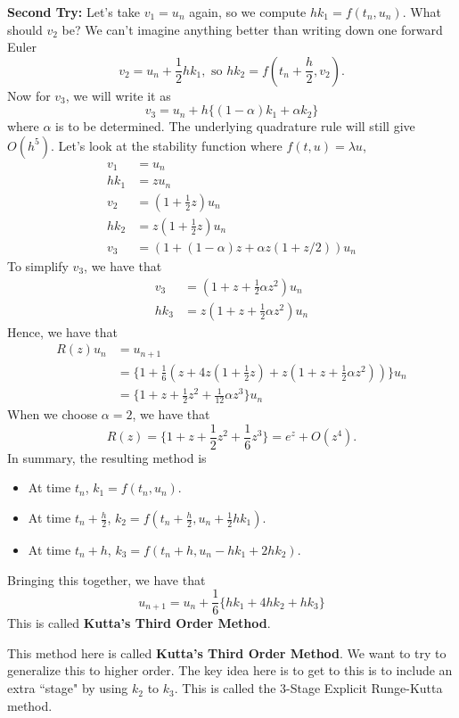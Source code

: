 \documentclass{article}
\begin{document}
\textbf{Second Try: } Let's take $v_1 = u_n$ again, so we compute $h k_1 = f(t_n, u_n)$. What should $v_2$ be? We can't imagine anything better than writing down one forward Euler
\[v_2 = u_n + \frac{1}{2} h k_1, \text{ so } h k_2 = f(t_n + \frac{h}{2}, v_2).\]
Now for $v_3$, we will write it as
\[v_3 = u_n + h \{(1 - \alpha) k_1 + \alpha k_2\} \]
where $\alpha$ is to be determined. The underlying quadrature rule will still give $O(h^5)$. Let's look at the stability function where $f(t, u) = \lambda u$,
\begin{align*}
    v_1 &= u_n\\
    h k_1 &= z u_n\\
    v_2 &= (1 + \frac{1}{2}z) u_n\\
    h k_2 &= z (1 + \frac{1}{2}z) u_n\\
    v_3 &= (1 + (1-\alpha) z + \alpha z (1 + z/2)) u_n
\end{align*}
To simplify $v_3$, we have that
\begin{align*}
    v_3 &= (1 + z + \frac{1}{2} \alpha z^2) u_n\\
    h k_3 &= z (1 + z + \frac{1}{2} \alpha z^2) u_n
\end{align*}
Hence, we have that
\begin{align*}
    R(z) u_n &= u_{n+1}\\
    &= \{1 + \frac{1}{6} (z + 4 z (1 + \frac{1}{2} z) + z (1 + z + \frac{1}{2} \alpha z^2)) \} u_n\\
    &= \{1 + z + \frac{1}{2} z^2 + \frac{1}{12} \alpha z^3\} u_n
\end{align*}
When we choose $\alpha = 2$, we have that
\[R(z) =  \{1 + z + \frac{1}{2} z^2 + \frac{1}{6} z^3\} = e^z + O(z^4).\]
In summary, the resulting method is
\begin{itemize}
    \item At time $t_n$, $k_1 = f(t_n, u_n)$.
    \item At time $t_n + \frac{h}{2}$, $k_2 = f(t_n + \frac{h}{2}, u_n + \frac{1}{2} h k_1)$.
    \item At time $t_n + h$, $k_3 = f(t_n + h, u_n - h k_1 + 2h k_2)$.
\end{itemize}
Bringing this together, we have that
\[u_{n+1} = u_n + \frac{1}{6} \{h k_1 + 4 h k_2 + h k_3\}\]
This is called \textbf{Kutta's Third Order Method}.

This method here is called \textbf{Kutta's Third Order Method}. We want to try to generalize this to higher order. The key idea here is to get to this is to include an extra ``stage" by using $k_2$ to $k_3$. This is called the $3$-Stage Explicit Runge-Kutta method.\\
\end{document}
